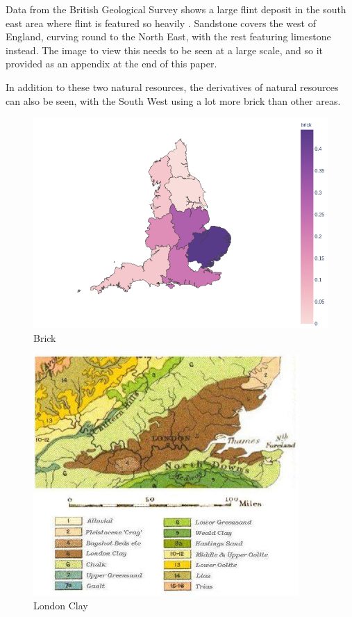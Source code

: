 \documentclass[11pt]{article}
\begin{document}
\vspace{1cm}
Data from the British Geological Survey shows a large flint deposit in the south east area where flint is featured so heavily \cite{bgs}. Sandstone covers the west of England, curving round to the North East, with the rest featuring limestone instead. The image to view this needs to be seen at a large scale, and so it provided as an appendix at the end of this paper.

In addition to these two natural resources, the derivatives of natural resources can also be seen, with the South West using a lot more brick than other areas.

\begin{minipage}{0.45\textwidth}
	\begin{figure}[H]
		\centering
		\includegraphics[width=\textwidth]{brick.png}
		\caption{Brick}
	\end{figure}
\end{minipage}
\begin{minipage}{0.45\textwidth}
	\begin{figure}[H]
		\centering
		\includegraphics[width=0.9\textwidth]{Geological_map_of_London_Basin.jpg}
		\caption{London Clay}
	\end{figure}
\end{minipage}
\end{document}
